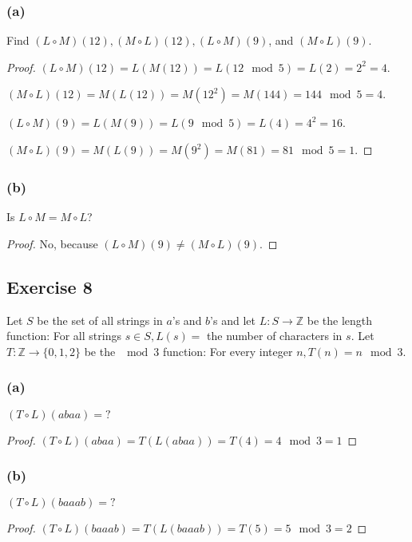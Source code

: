 \documentclass[14pt]{extarticle}
\newcommand{\Z}{\mathbb{Z}}
\begin{document}
\subsubsection{(a)}
Find \((L \circ M)(12), (M \circ L)(12), (L \circ M)(9)\), and \((M \circ L)(9)\).

\begin{proof}
    \((L \circ M)(12) = L(M(12)) = L(12 \mod 5) = L(2) = 2^2 = 4\).

    \((M \circ L)(12) = M(L(12)) = M(12^2) = M(144) = 144 \mod 5 = 4\).

    \((L \circ M)(9) = L(M(9)) = L(9 \mod 5) = L(4) = 4^2 = 16\).

    \((M \circ L)(9) = M(L(9)) = M(9^2) = M(81) = 81 \mod 5 = 1\).
\end{proof}

\subsubsection{(b)}
Is \(L \circ M = M \circ L\)?

\begin{proof}
    No, because \((L \circ M)(9) \neq (M \circ L)(9)\).
\end{proof}

\subsection{Exercise 8}
Let $S$ be the set of all strings in $a$’s and $b$’s and let \(L: S \to \Z\) be the length function: For all strings
\(s \in S, L(s) =\) the number of characters in $s$. Let \(T: \Z \to \{0, 1, 2\}\) be the $\mod 3$ function: For
every integer \(n, T(n) = n \mod 3\).

\subsubsection{(a)}
\((T \circ L)(abaa) = ?\)

\begin{proof}
    \((T \circ L)(abaa) = T(L(abaa)) = T(4) = 4 \mod 3 = 1\)
\end{proof}

\subsubsection{(b)}
\((T \circ L)(baaab) = ?\)

\begin{proof}
    \((T \circ L)(baaab) = T(L(baaab)) = T(5) = 5 \mod 3 = 2\)
\end{proof}
\end{document}
